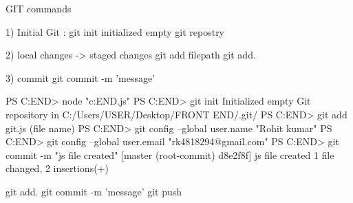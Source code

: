 GIT commands

1) Initial Git :  
git init
initialized  empty git repostry

2) local changes -> staged changes
git add filepath
git add.

3) commit
 git commit -m 'message'


PS C:\Users\USER\Desktop\FRONT END> node "c:\Users\USER\Desktop\FRONT END\git.js"
PS C:\Users\USER\Desktop\FRONT END> git init
Initialized empty Git repository in C:/Users/USER/Desktop/FRONT END/.git/
PS C:\Users\USER\Desktop\FRONT END> git add git.js (file name)
PS C:\Users\USER\Desktop\FRONT END> git config --global user.name "Rohit kumar"
PS C:\Users\USER\Desktop\FRONT END> git config --global user.email "rk4818294@gmail.com"
PS C:\Users\USER\Desktop\FRONT END> git commit -m "js file created"
[master (root-commit) d8e2f8f] js file created
 1 file changed, 2 insertions(+)












 git add.
 git commit -m 'message'
 git push